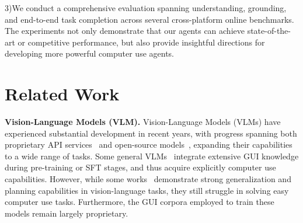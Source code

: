 \documentclass{article} %
\begin{document}
3)We conduct a comprehensive evaluation spanning understanding, grounding, and end-to-end task completion across several cross-platform online benchmarks.
The experiments not only demonstrate that our agents can achieve state-of-the-art or competitive performance, but also provide insightful directions for developing more powerful computer use agents.

\section{Related Work}
\label{related_work}
\textbf{Vision-Language Models (VLM).}
Vision-Language Models (VLMs) have experienced substantial development in recent years, with progress spanning both proprietary API services~\citep{team2023gemini, team2024gemini, anthropic2024claude35, xai2025grok3, OpenAI2023GPT4TR, hurst2024gpt} and open-source models~\citep{wang2024qwen2vl, bai2025qwen25vl, chen2024internvl, chen2024expanding, zhu2025internvl3, coreteam2025mimovltechnicalreport, team2025gemma, metaai2025llama4}, expanding their capabilities to a wide range of tasks.
% 
Some general VLMs~\citep{team2025kimi, guo2025seed1, bai2025qwen25vl, zhu2025internvl3, coreteam2025mimovltechnicalreport,wang2025internvl35} integrate extensive GUI knowledge during pre-training or SFT stages, and thus acquire explicitly computer use capabilities.  
% 
However, while some works~\citep{hurst2024gpt,anthropic2024claude35,guo2025seed1,zhu2025internvl3,bai2025qwen25vl} demonstrate strong generalization and planning capabilities in vision-language tasks, they still struggle in solving easy computer use tasks. 
% 
Furthermore, the GUI corpora employed to train these models remain largely proprietary. 
% 
\end{document}
